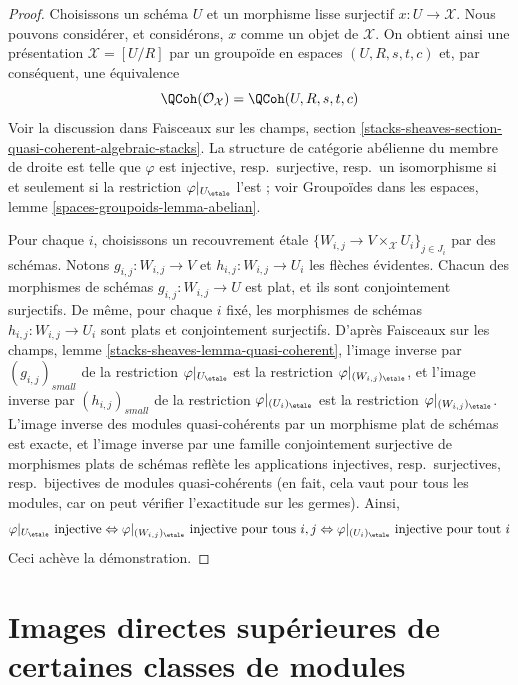 \begin{proof}
Choisissons un schéma $U$ et un morphisme lisse surjectif
$x : U \to \mathcal{X}$. Nous pouvons considérer, et considérons, $x$
comme un objet de $\mathcal{X}$.
On obtient ainsi une présentation $\mathcal{X} = [U/R]$ par un groupoïde
en espaces $(U, R, s, t, c)$ et, par conséquent, une équivalence
$$
\QCoh(\mathcal{O}_\mathcal{X}) = \QCoh(U, R, s, t, c)
$$
Voir la discussion dans Faisceaux sur les champs, section
\ref{stacks-sheaves-section-quasi-coherent-algebraic-stacks}.
La structure de catégorie abélienne du membre de droite est telle que $\varphi$
est injective, resp.\ surjective, resp.\ un isomorphisme
si et seulement si la restriction $\varphi|_{U_\etale}$ l'est ; voir
Groupoïdes dans les espaces, lemme \ref{spaces-groupoids-lemma-abelian}.

\medskip\noindent
Pour chaque $i$, choisissons un recouvrement étale
$\{W_{i, j} \to V \times_\mathcal{X} U_i\}_{j \in J_i}$
par des schémas. Notons $g_{i, j} : W_{i, j} \to V$ et
$h_{i, j} : W_{i, j} \to U_i$ les flèches évidentes.
Chacun des morphismes de schémas $g_{i, j} : W_{i, j} \to U$ est plat,
et ils sont conjointement surjectifs.
De même, pour chaque $i$ fixé, les morphismes de schémas
$h_{i, j} : W_{i, j} \to U_i$ sont plats et conjointement surjectifs.
D'après Faisceaux sur les champs, lemme \ref{stacks-sheaves-lemma-quasi-coherent},
l'image inverse par $(g_{i, j})_{small}$ de la restriction
$\varphi|_{U_\etale}$ est la restriction $\varphi|_{(W_{i, j})_\etale}$,
et l'image inverse par $(h_{i, j})_{small}$ de la restriction
$\varphi|_{(U_i)_\etale}$ est la restriction $\varphi|_{(W_{i, j})_\etale}$.
L'image inverse des modules quasi-cohérents par un morphisme plat de schémas est exacte,
et l'image inverse par une famille conjointement surjective de morphismes plats de schémas
reflète les applications injectives, resp.\ surjectives, resp.\ bijectives
de modules quasi-cohérents (en fait, cela vaut pour tous les modules,
car on peut vérifier l'exactitude sur les germes). Ainsi,
$$
\varphi|_{U_\etale} \text{ injective}
\Leftrightarrow
\varphi|_{(W_{i, j})_\etale} \text{ injective pour tous }i, j
\Leftrightarrow
\varphi|_{(U_i)_\etale} \text{ injective pour tout }i
$$
Ceci achève la démonstration.
\end{proof}




\section{Images directes supérieures de certaines classes de modules}
\label{section-key}

